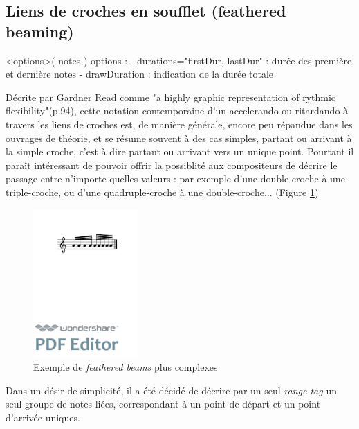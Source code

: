 \documentclass{article}
\newenvironment{gmncode}	{\vspace{-2mm}\small\verbatim}{\endverbatim\vspace{-2mm}}
\begin{document}
\subsection{Liens de croches en soufflet (feathered beaming)}
\bigskip

\begin{gmncode}
\fBeam<options>( notes )
  options : 
    - durations="firstDur, lastDur" : 
      durée des première et dernière notes
    - drawDuration : 
      indication de la durée totale

\end{gmncode}

Décrite par Gardner Read \cite{read1969music} comme "a highly graphic representation of rythmic flexibility"(p.94), cette notation contemporaine d'un accelerando ou ritardando à travers les liens de croches est, de manière générale, encore peu répandue dans les ouvrages de théorie, et se résume souvent à des cas simples, partant ou arrivant à la simple croche, c'est à dire partant ou arrivant vers un unique point. Pourtant il paraît intéressant de pouvoir offrir la possiblité aux compositeurs de décrire le passage entre n'importe quelles valeurs : par exemple d'une double-croche à une triple-croche, ou d'une quadruple-croche à une double-croche... (Figure \ref{fig:fbeamcomplex})

\begin{figure}[h]
\centering
\includegraphics[width=40mm]{img/fbeamcomplex.pdf}
\caption{Exemple de \emph{feathered beams} plus complexes}
\label{fig:fbeamcomplex}
\end{figure}

Dans un désir de simplicité, il a été décidé de décrire par un seul \emph{range-tag} un seul groupe de notes liées, correspondant à un point de départ et un point d'arrivée uniques.
\end{document}
